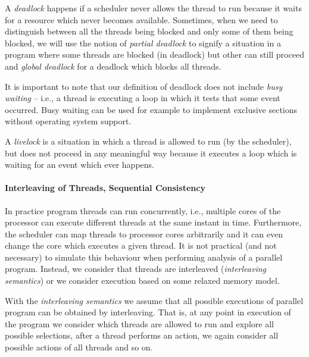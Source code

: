 \begin{definition}\label{def:deadlock}
    A \emph{deadlock} happens if a scheduler never allows the thread to run
    because it waits for a resource which never becomes available.
    Sometimes, when we need to distinguish between all the threads being
    blocked and only some of them being blocked, we will use the notion of
    \emph{partial deadlock} to signify a situation in a program where some
    threads are blocked (in deadlock) but other can still proceed and
    \emph{global deadlock} for a deadlock which blocks all threads.
\end{definition}

It is important to note that our definition of deadlock does not include
\emph{busy waiting} -- i.e., a thread is executing a loop in which it tests
that some event occurred.
Busy waiting can be used for example to implement exclusive sections without
operating system support.

\begin{definition}[Livelock]\label{def:livelock}
    A \emph{livelock} is a situation in which a thread is allowed to run (by
    the scheduler), but does not proceed in any meaningful way because it
    executes a loop which is waiting for an event which ever happens.
\end{definition}

\paragraph{Interleaving of Threads, Sequential Consistency}

In practice program threads can run concurrently, i.e., multiple cores of the
processor can execute different threads at the same instant in time.
Furthermore, the scheduler can map threads to processor cores arbitrarily and
it can even change the core which executes a given thread.
It is not practical (and not necessary) to simulate this behaviour when
performing analysis of a parallel program.
Instead, we consider that threads are interleaved (\emph{interleaving
semantics}) or we consider execution based on some relaxed memory model.

\begin{definition}
    With the \emph{interleaving semantics} we assume that all possible
    executions of parallel program can be obtained by interleaving.
    That is, at any point in execution of the program we consider which threads
    are allowed to run and explore all possible selections, after a thread
    performs an action, we again consider all possible actions of all threads
    and so on.
\end{definition}

